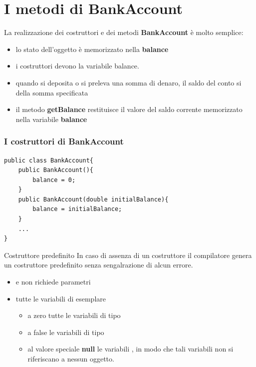 \section*{I metodi di BankAccount}
\begin{frame}
\begin{block}{}
La realizzazione dei costruttori e dei metodi \textbf{BankAccount} è molto semplice:
\begin{itemize}
\item lo stato dell'oggetto è memorizzato nella  \textbf{balance}
\item i costruttori devono  la variabile balance.
\item quando si deposita o si preleva una somma di denaro, il saldo del conto si  della
somma specificata
\item il metodo \textbf{getBalance} restituisce il valore del saldo corrente memorizzato nella variabile 
\textbf{balance}
\end{itemize}
\end{block}
\end{frame}

\begin{frame}[fragile]
\frametitle{I costruttori di BankAccount}
\begin{lstlisting}
public class BankAccount{
    public BankAccount(){
        balance = 0;
    }
    public BankAccount(double initialBalance){
        balance = initialBalance;
    }
    ...
}
\end{lstlisting}
\end{frame}

\begin{frame}
\begin{block}{Costruttore predefinito}
In caso di assenza di un costruttore il compilatore genera \alert{un costruttore predefinito} senza sengalrazione
di alcun errore.
\begin{itemize}
\item {} e non richiede parametri
\item {} tutte le variabili di esemplare
\begin{itemize}
\item a zero tutte le variabili di tipo 
\item a false le variabili di tipo 
\item al valore speciale \textbf{null} le variabili , in modo che tali variabili non si riferiscano 
a nessun oggetto.
\end{itemize}
\end{itemize}
\end{block}
\end{frame}

